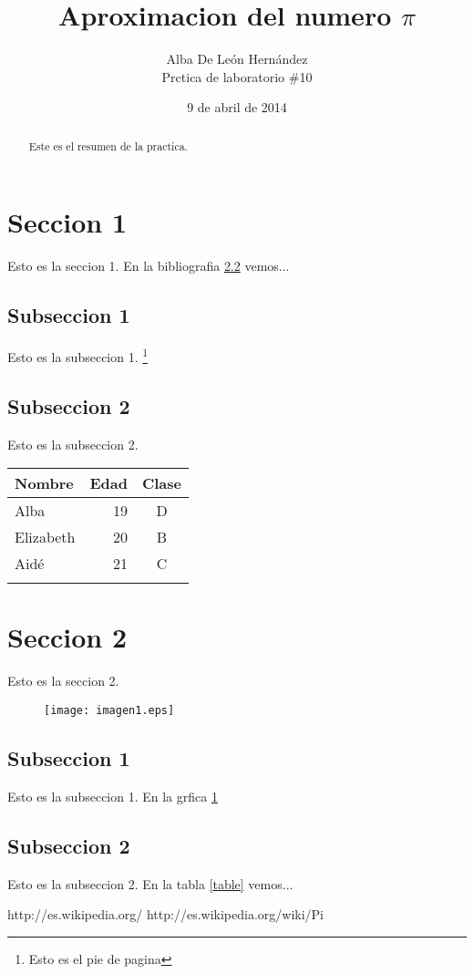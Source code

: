 \documentclass[a4paper,10pt]{article}
\begin{document}
\title{Aproximacion del numero $\pi$}
\author{Alba De León Hernández\\Prctica de laboratorio \#10}
\date{9 de abril de 2014}
\maketitle

\begin{abstract}
 Este es el resumen de la practica.
\end{abstract}

\section{Seccion 1}
Esto es la seccion 1.
En la bibliografia \ref{} vemos...
\subsection{Subseccion 1}
Esto es la subseccion 1.
\footnote{Esto es el pie de pagina}
\subsection{Subseccion 2}
Esto es la subseccion 2.
\begin{tabular}{lrc}
Nombre&Edad&Clase \\
\hline
Alba & 19 & D \\
Elizabeth & 20 & B \\
Aidé & 21 & C \\
\label{table}
\end{tabular}

\section{Seccion 2}
Esto es la seccion 2.
\cite{pi}
\cite{pi2}
\begin{figure}
\texttt{[image: imagen1.eps]}
\label{fig1}
\end{figure}
\subsection{Subseccion 1}
Esto es la subseccion 1.
En la grfica \ref{fig1}
\subsection{Subseccion 2}
Esto es la subseccion 2.
En la tabla \ref{table} vemos...

\begin{thebibliography}{1}
  http://es.wikipedia.org/
 http://es.wikipedia.org/wiki/Pi
\end{thebibliography}
\end{document}
